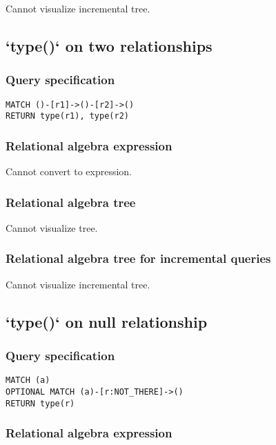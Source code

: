 Cannot visualize incremental tree.

\subsection{`type()` on two relationships}

\subsubsection*{Query specification}

\begin{lstlisting}
MATCH ()-[r1]->()-[r2]->()
RETURN type(r1), type(r2)
\end{lstlisting}

\subsubsection*{Relational algebra expression}

Cannot convert to expression.

\subsubsection*{Relational algebra tree}

Cannot visualize tree.

\subsubsection*{Relational algebra tree for incremental queries}

Cannot visualize incremental tree.

\subsection{`type()` on null relationship}

\subsubsection*{Query specification}

\begin{lstlisting}
MATCH (a)
OPTIONAL MATCH (a)-[r:NOT_THERE]->()
RETURN type(r)
\end{lstlisting}

\subsubsection*{Relational algebra expression}

